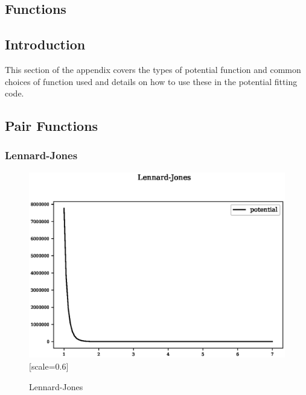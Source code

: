 \documentclass[12pt,twoside]{manual}
\begin{document}
\section{}







\begin{appendices}




\chapter{Functions}

\section{Introduction}

This section of the appendix covers the types of potential function and common choices of function used and details on how to use these in the potential fitting code.


\section{Pair Functions}

\subsection{Lennard-Jones}

\begin{figure}[h]
  \begin{center}
    \includegraphics{img/plots/lennard_jones.eps}[scale=0.6]
    \caption{Lennard-Jones}
    \label{graph:graph1}
  \end{center}
\end{figure}


\end{appendices}
\end{document}
